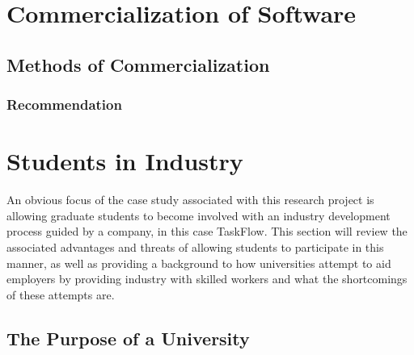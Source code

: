 \section{Commercialization of Software}
\subsection{Methods of Commercialization}
\subsubsection{Recommendation}

\section{Students in Industry}
\par{An obvious focus of the case study associated with this research project is allowing graduate students to become involved with an industry development process guided by a company, in this case TaskFlow. This section will review the associated advantages and threats of allowing students to participate in this manner, as well as providing a background to how universities attempt to aid employers by providing industry with skilled workers and what the shortcomings of these attempts are.}
\subsection{The Purpose of a University}

